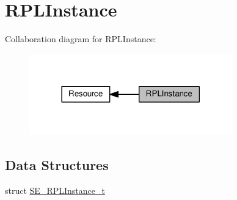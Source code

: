 \hypertarget{group__RPLInstance}{}\section{R\+P\+L\+Instance}
\label{group__RPLInstance}
Collaboration diagram for R\+P\+L\+Instance\+:\nopagebreak
\begin{figure}[H]
\begin{center}
\leavevmode
\includegraphics[width=249pt]{group__RPLInstance}
\end{center}
\end{figure}
\subsection*{Data Structures}
\begin{DoxyCompactItemize}
\item 
struct \hyperlink{structSE__RPLInstance__t}{S\+E\+\_\+\+R\+P\+L\+Instance\+\_\+t}
\end{DoxyCompactItemize}
